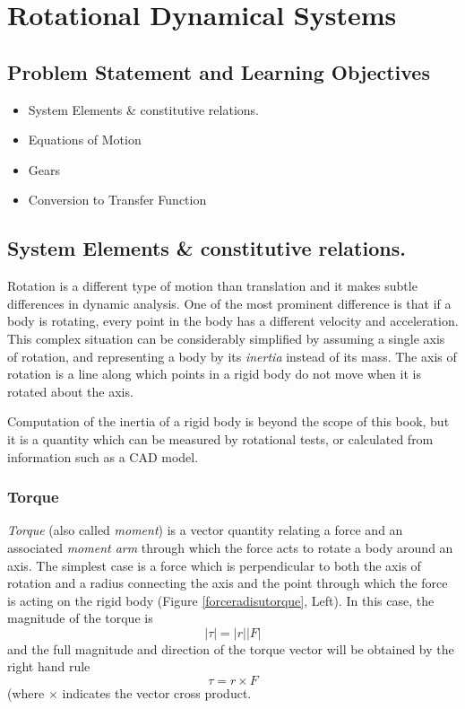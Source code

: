 %
%
%


\chapter{Rotational Dynamical Systems}

\section{Problem Statement and Learning Objectives}

\begin{itemize}
  \item System Elements \& constitutive relations.
  \item Equations of Motion
  \item Gears
  \item Conversion to Transfer Function
\end{itemize}

\section{System Elements \& constitutive relations.}

Rotation is a different type of motion than translation and it makes subtle differences in dynamic analysis.   One of the most prominent difference is that if a body is rotating, every point in the body has a different velocity and acceleration.   This complex situation can be considerably simplified by assuming a single axis of rotation, and representing a body by its {\it inertia} instead of its mass.   The axis of rotation is a line along which points in a rigid body do not move when it is rotated about the axis.  

Computation of the inertia of a rigid body is beyond the scope of this book, but it is a quantity which can be measured by rotational tests, or calculated from information such as a CAD model.  

\subsection{Torque}

{\it Torque} (also called {\it moment}) is a vector quantity relating a force and an associated {\it moment arm} through which the force acts to rotate a body around an axis.   The simplest case is a force which is perpendicular to both the axis of rotation and a radius connecting the axis and the point through which the force is acting on the rigid body (Figure \ref{forceradisutorque}, Left). In this case, the magnitude of the torque is 
\[
|\tau| = |r||F|
\]
and the full magnitude and direction of the torque vector will be obtained by the right hand rule
\[
\tau = r \times F
\]
(where $\times$ indicates the vector cross product.

